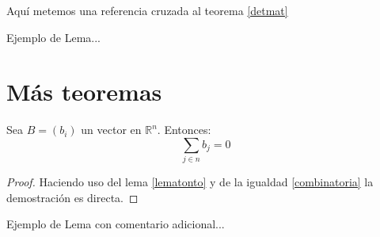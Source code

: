 \documentclass[a4paper,11pt]{article}
\begin{document}
Aquí metemos una referencia cruzada al teorema \ref{detmat}

\begin{lem}\label{lematonto}
Ejemplo de Lema...
\end{lem}

\section{Más teoremas}

\begin{teo}\label{detvec} 
Sea $B=(b_{i})$ un vector en $\mathbb{R}^n$. Entonces:
\begin{equation}
\sum_{j\in n}b_{j} = 0
\end{equation}
\end{teo}

\begin{proof}
Haciendo uso del lema \ref{lematonto} y de la igualdad 
\eqref{combinatoria} la demostración es directa.
\end{proof}

\begin{lem}
\label{lemanuevo}
Ejemplo de Lema con comentario adicional...
\end{lem}
\end{document}
